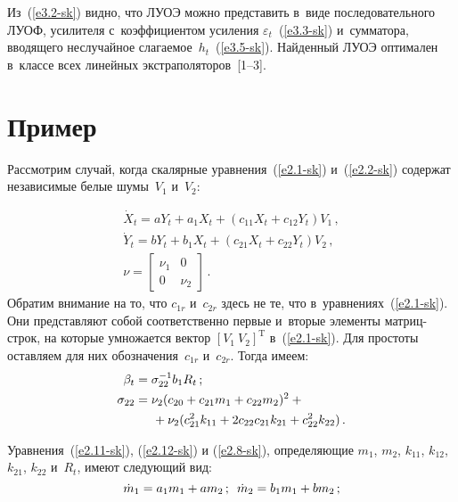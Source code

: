 \begin{multicols}{2}
Из~(\ref{e3.2-sk}) видно, что ЛУОЭ можно представить в~виде последовательного
ЛУОФ, усилителя с~коэффициентом усиления  $\varepsilon_t$~(\ref{e3.3-sk})
и~сумматора, вводящего неслучайное слагаемое~$h_t$~(\ref{e3.5-sk}).
Найденный ЛУОЭ оптимален в~классе всех линейных экстраполяторов~[1--3].

\vspace*{-6pt}

\section{Пример}

\vspace*{-2pt}

Рассмотрим случай, когда  скалярные уравнения~(\ref{e2.1-sk}) и~(\ref{e2.2-sk}) содержат
независимые белые шумы~$V_1$ и~$V_2$:

\noindent
\begin{gather*}
    \dot X_t = a Y_t + a_{1} X_t +( c_{11}X_t+ c_{12}Y_t ) V_1\,,\\
    \dot Y_t = b Y_t + b_{1} X_t +( c_{21}X_t+ c_{22}Y_t ) V_2\,,\\
\nu =\begin{bmatrix}
\nu_{1}&0\\
0&\nu_{2}\end{bmatrix}\,. %
\end{gather*}
Обратим внимание на то, что  $c_{1r}$ и~$c_{2r}$ здесь не те, что
в~уравнениях~(\ref{e2.1-sk}). Они представляют собой соответственно первые
и~вторые элементы мат\-риц-строк, на которые умножается вектор $\left[V_1\ V_2\right]^{\mathrm{T}}$
в~(\ref{e2.1-sk}). Для простоты оставляем для них обозначения~$c_{1r}$
и~$c_{2r}$. Тогда имеем:
  \begin{align*}
  \beta_t&= \sigma_{22}^{-1} b_{1}R_t\,; %
  \\
\sigma_{22} &= \nu_2 (c_{20} + c_{21} m_1+ c_{22} m_2)^2 + {}\\
&\hspace*{5mm}{}+
\nu_2  (c_{21}^2 k_{11} +  2c_{22} c_{21} k_{21}+ c_{22}^2k_{22})\,. %
\end{align*}

Уравнения~(\ref{e2.11-sk}), (\ref{e2.12-sk}) и (\ref{e2.8-sk}),
определяющие  $m_1$, $m_2$, $k_{11}$, $k_{12}$, $k_{21}$, $k_{22}$ и~$R_t$,
имеют  сле\-ду\-ющий вид:
\begin{equation}
\dot m_1 = a_1 m_1 + a m_2\,;\enskip \dot m_2 = b_1 m_1 + b m_2 \,;\label{e4.5-sk}
\end{equation}


\end{multicols}

